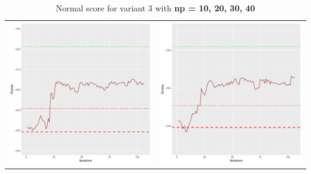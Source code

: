\documentclass[]{scrartcl}
\begin{document}
\begin{table}[h!]
\begin{tabular}{cc}
\includegraphics[scale = 0.4]{./figs/asia/v3/30/boundsEvolution-107.pdf} & 
\includegraphics[scale = 0.4]{./figs/asia/v3/40/boundsEvolution-107.pdf} \\
\end{tabular}
\caption{Normal score for variant 3 with \textbf{np =  10, 20, 30, 40}}
\end{table}
\end{document}
